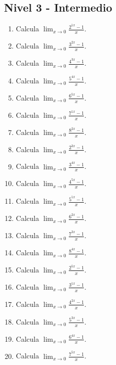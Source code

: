 \documentclass[11pt,a4paper]{article}
\begin{document}
\newpage

\subsection{Nivel 3 - Intermedio}

\begin{enumerate}[label=\textbf{E\arabic*.},start=341]

\item Calcula $\displaystyle\lim_{x\to0}\frac{2^{1x}-1}{x}$.

\item Calcula $\displaystyle\lim_{x\to0}\frac{3^{2x}-1}{x}$.

\item Calcula $\displaystyle\lim_{x\to0}\frac{4^{3x}-1}{x}$.

\item Calcula $\displaystyle\lim_{x\to0}\frac{5^{4x}-1}{x}$.

\item Calcula $\displaystyle\lim_{x\to0}\frac{6^{5x}-1}{x}$.

\item Calcula $\displaystyle\lim_{x\to0}\frac{7^{1x}-1}{x}$.

\item Calcula $\displaystyle\lim_{x\to0}\frac{8^{2x}-1}{x}$.

\item Calcula $\displaystyle\lim_{x\to0}\frac{2^{3x}-1}{x}$.

\item Calcula $\displaystyle\lim_{x\to0}\frac{3^{4x}-1}{x}$.

\item Calcula $\displaystyle\lim_{x\to0}\frac{4^{5x}-1}{x}$.

\item Calcula $\displaystyle\lim_{x\to0}\frac{5^{1x}-1}{x}$.

\item Calcula $\displaystyle\lim_{x\to0}\frac{6^{2x}-1}{x}$.

\item Calcula $\displaystyle\lim_{x\to0}\frac{7^{3x}-1}{x}$.

\item Calcula $\displaystyle\lim_{x\to0}\frac{8^{4x}-1}{x}$.

\item Calcula $\displaystyle\lim_{x\to0}\frac{2^{5x}-1}{x}$.

\item Calcula $\displaystyle\lim_{x\to0}\frac{3^{1x}-1}{x}$.

\item Calcula $\displaystyle\lim_{x\to0}\frac{4^{2x}-1}{x}$.

\item Calcula $\displaystyle\lim_{x\to0}\frac{5^{3x}-1}{x}$.

\item Calcula $\displaystyle\lim_{x\to0}\frac{6^{4x}-1}{x}$.

\item Calcula $\displaystyle\lim_{x\to0}\frac{7^{5x}-1}{x}$.

\end{enumerate}
\end{document}
